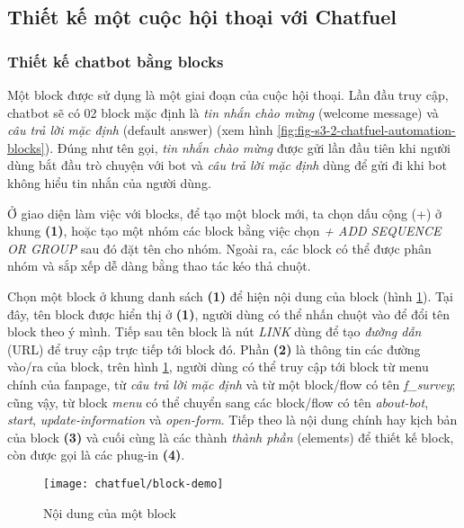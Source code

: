 \subsection{Thiết kế một cuộc hội thoại với Chatfuel}
\subsubsection{Thiết kế chatbot bằng blocks}
Một block được sử dụng là một giai đoạn của cuộc hội thoại. Lần đầu truy cập, chatbot sẽ có 02 block mặc định là \textit{tin nhắn chào mừng} (welcome message) và \textit{câu trả lời mặc định} (default answer) (xem hình \ref{fig:fig-s3-2-chatfuel-automation-blocks}). Đúng như tên gọi, \textit{tin nhắn chào mừng} được gửi lần đầu tiên khi người dùng bắt đầu trò chuyện với bot và \textit{câu trả lời mặc định} dùng để gửi đi khi bot không hiểu tin nhắn của người dùng.\par
Ở giao diện làm việc với blocks, để tạo một block mới, ta chọn dấu cộng (+) ở khung \textbf{(1)}, hoặc tạo một nhóm các block bằng việc chọn \textit{+ ADD SEQUENCE OR GROUP} sau đó đặt tên cho nhóm. Ngoài ra, các block có thể được phân nhóm và sắp xếp dễ dàng bằng thao tác kéo thả chuột.\par
Chọn một block ở khung danh sách \textbf{(1)} để hiện nội dung của block (hình \ref{fig:fig-s3-6-chatfuel-block-menu}). Tại đây, tên block được hiển thị ở \textbf{(1)}, người dùng có thể nhấn chuột vào để đổi tên block theo ý mình. Tiếp sau tên block là nút \textit{LINK} dùng để tạo \textit{đường dẫn} (URL) để truy cập trực tiếp tới block đó. Phần \textbf{(2)} là thông tin các đường vào/ra của block, trên hình \ref{fig:fig-s3-6-chatfuel-block-menu}, người dùng có thể truy cập tới block từ menu chính của fanpage, từ \textit{câu trả lời mặc định} và từ một block/flow có tên \textit{f\_survey}; cũng vậy, từ block \textit{menu} có thể chuyển sang các block/flow có tên \textit{about-bot}, \textit{start}, \textit{update-information} và \textit{open-form}. Tiếp theo là nội dung chính hay kịch bản của block \textbf{(3)} và cuối cùng là các thành \textit{thành phần} (elements) để thiết kế block, còn được gọi là các phug-in \textbf{(4)}.\par
\begin{figure}[htb!]\centering
	\texttt{[image: chatfuel/block-demo]}
	\caption{Nội dung của một block}
	\label{fig:fig-s3-6-chatfuel-block-menu}
\end{figure}\par

